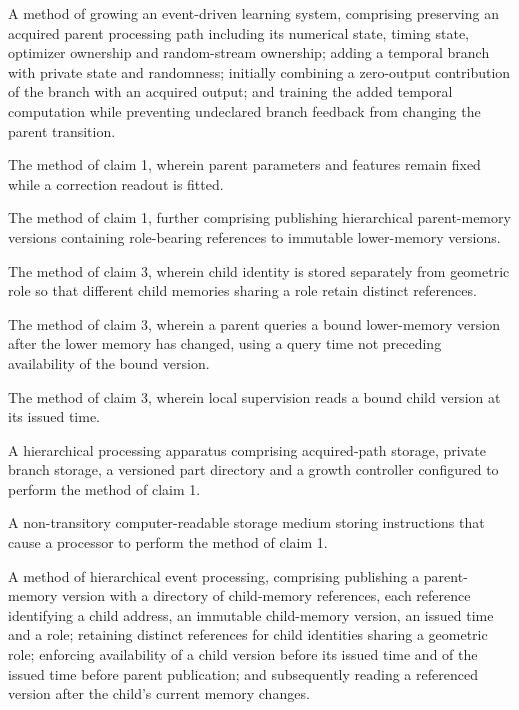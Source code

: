 \documentclass[pct]{sm-patent}
\begin{document}
\begin{patentclaims}

\item A method of growing an event-driven learning system, comprising preserving an acquired parent processing path including its numerical state, timing state, optimizer ownership and random-stream ownership; adding a temporal branch with private state and randomness; initially combining a zero-output contribution of the branch with an acquired output; and training the added temporal computation while preventing undeclared branch feedback from changing the parent transition.

\item The method of claim 1, wherein parent parameters and features remain fixed while a correction readout is fitted.

\item The method of claim 1, further comprising publishing hierarchical parent-memory versions containing role-bearing references to immutable lower-memory versions.

\item The method of claim 3, wherein child identity is stored separately from geometric role so that different child memories sharing a role retain distinct references.

\item The method of claim 3, wherein a parent queries a bound lower-memory version after the lower memory has changed, using a query time not preceding availability of the bound version.

\item The method of claim 3, wherein local supervision reads a bound child version at its issued time.

\item A hierarchical processing apparatus comprising acquired-path storage, private branch storage, a versioned part directory and a growth controller configured to perform the method of claim 1.

\item A non-transitory computer-readable storage medium storing instructions that cause a processor to perform the method of claim 1.

\item A method of hierarchical event processing, comprising publishing a parent-memory version with a directory of child-memory references, each reference identifying a child address, an immutable child-memory version, an issued time and a role; retaining distinct references for child identities sharing a geometric role; enforcing availability of a child version before its issued time and of the issued time before parent publication; and subsequently reading a referenced version after the child's current memory changes.


\end{patentclaims}
\end{document}
